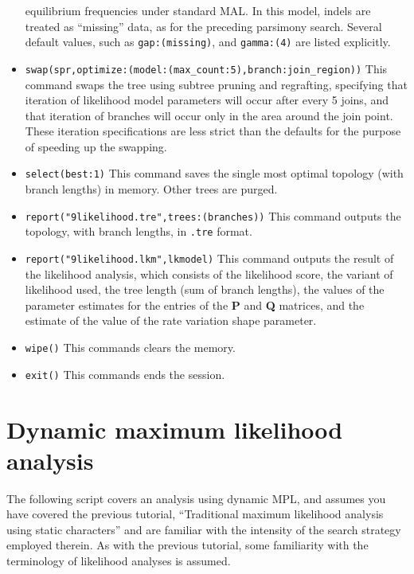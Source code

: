 \begin{itemize}
equilibrium frequencies under standard MAL. In this model, indels are treated as ``missing'' data, as for the 
preceding parsimony search. Several default values, such as \texttt{gap:(missing)}, and \texttt{gamma:(4)} are 
listed explicitly.
\item \texttt{swap(spr,optimize:(model:(max\_count:5),branch:join\_region))} This command swaps the tree using 
subtree pruning and regrafting, specifying that iteration of likelihood model parameters will occur after every 5 
joins, and that iteration of branches will occur only in the area around the join point. These iteration 
specifications are less strict than the defaults for the purpose of speeding up the swapping.
\item \texttt{select(best:1)} This command saves the single most optimal topology (with branch lengths) in 
memory. Other trees are purged.
\item \texttt{report("9likelihood.tre",trees:(branches))} This command outputs the topology, with branch lengths, in 
\texttt{.tre} format.
\item \texttt{report("9likelihood.lkm",lkmodel)} This command outputs the result of the likelihood analysis, which 
consists of the likelihood score, the variant of likelihood used, the tree length (sum of branch lengths), the values 
of the parameter estimates for the entries of the \textbf{P} and \textbf{Q} matrices, and the estimate of the value of 
the rate variation shape parameter.
\item \texttt{wipe()} This commands clears the memory.
\item \texttt{exit()} This commands ends the \poy session.
\end{itemize}

\section{Dynamic maximum likelihood analysis}{\label{tutorial11}}
The following script covers an analysis using dynamic MPL, and assumes you have covered the previous 
tutorial, ``Traditional maximum likelihood analysis using static characters'' and are familiar with the intensity of 
the search strategy employed therein. As with the previous tutorial, some familiarity with the terminology of 
likelihood analyses is assumed.

